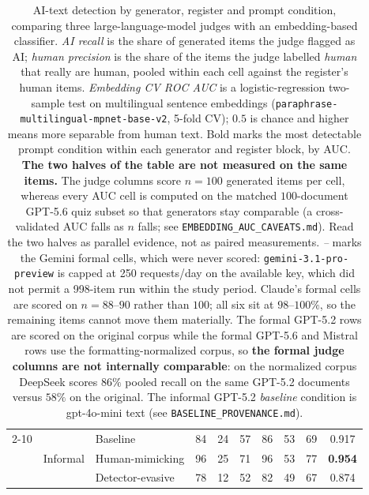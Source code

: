 \begin{table}[t]
\begin{tabular}{lll ccc ccc c}
    \cmidrule(l){2-10}
      & \multirow{3}{*}{Informal}
        & Baseline         & 84 & 24 & 57 & 86 & 53 & 69 & 0.917 \\
      & & Human-mimicking  & 96 & 25 & 71 & 96 & 53 & 77 & \textbf{0.954} \\
      & & Detector-evasive & 78 & 12 & 52 & 82 & 49 & 67 & 0.874 \\
    \bottomrule
  \end{tabular}
  \caption{AI-text detection by generator, register and prompt condition, comparing
  three large-language-model judges with an embedding-based classifier.
  \emph{AI recall} is the share of generated items the judge flagged as AI;
  \emph{human precision} is the share of the items the judge labelled \emph{human}
  that really are human, pooled within each cell against the register's human items.
  \emph{Embedding CV ROC AUC} is a logistic-regression two-sample test on multilingual
  sentence embeddings (\texttt{paraphrase-multilingual-mpnet-base-v2}, 5-fold CV);
  $0.5$ is chance and higher means more separable from human text. Bold marks the most
  detectable prompt condition within each generator and register block, by AUC.
  \textbf{The two halves of the table are not measured on the same items.} The judge
  columns score $n=100$ generated items per cell, whereas every AUC cell is computed on
  the matched $100$-document GPT-5.6 quiz subset so that generators stay comparable
  (a cross-validated AUC falls as $n$ falls; see \texttt{EMBEDDING\_AUC\_CAVEATS.md}).
  Read the two halves as parallel evidence, not as paired measurements.
  \emph{--} marks the Gemini formal cells, which were never scored:
  \texttt{gemini-3.1-pro-preview} is capped at 250 requests/day on the available key,
  which did not permit a 998-item run within the study period. Claude's formal cells
  are scored on $n=88$--$90$ rather than $100$; all six sit at $98$--$100\%$, so the
  remaining items cannot move them materially. The formal GPT-5.2 rows are scored on
  the original corpus while the formal GPT-5.6 and Mistral rows use the
  formatting-normalized corpus, so \textbf{the formal judge columns are not internally
  comparable}: on the normalized corpus DeepSeek scores $86\%$ pooled recall on the
  same GPT-5.2 documents versus $58\%$ on the original. The informal GPT-5.2
  \emph{baseline} condition is gpt-4o-mini text (see
  \texttt{BASELINE\_PROVENANCE.md}).}
  \label{tab:judge-embedding-merged}
\end{table}
